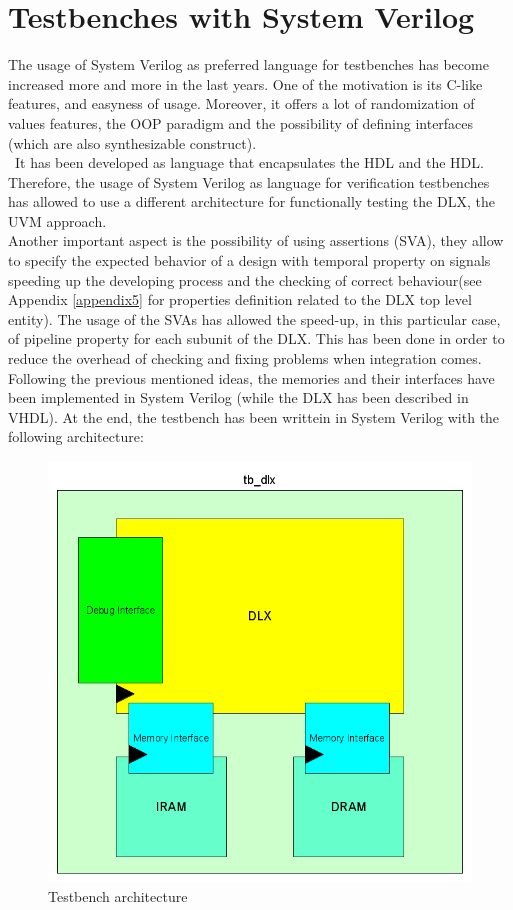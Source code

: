 \section{Testbenches with System Verilog}
The usage of System Verilog as preferred language for testbenches has become increased more and more in the last years. One of the motivation is its C-like features, and easyness of usage. Moreover, it offers a lot of randomization of values features, the OOP paradigm and the possibility of defining interfaces (which are also synthesizable construct).\\\
It has been developed as language that encapsulates the HDL and the HDL. Therefore, the usage of System Verilog as language for verification testbenches has allowed to use a different architecture for functionally testing the DLX, the UVM approach.\\
Another important aspect is the possibility of using assertions (SVA), they allow to specify the expected behavior of a design with temporal property on signals speeding up the developing process and the checking of correct behaviour(see Appendix \ref{appendix5} for properties definition related to the DLX top level entity). The usage of the SVAs has allowed the speed-up, in this particular case, of pipeline property  for each subunit of the DLX. This has been done in order to reduce the overhead of checking and fixing problems when integration comes.\\

Following the previous mentioned ideas, the memories and their interfaces have been implemented in System Verilog (while the DLX has been described in VHDL). At the end, the testbench has been writtein in System Verilog with the following architecture: 
\begin{figure}[!htbp]
\centering
\captionsetup{justification=centering}
\includegraphics[scale=0.4,angle=0]{./chapters/figures/tb_dlx.png}
\caption{Testbench architecture}
\label{fig:tbdlx}
\end{figure}


